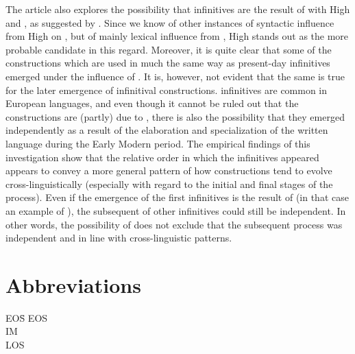 \documentclass[output=paper]{langscibook}
\begin{document}
The article also explores the possibility that  infinitives are the result of  with High  and , as suggested by \citet{Holm1967}. Since we know of other instances of syntactic influence from High  on , but of mainly lexical influence from , High  stands out as the more probable candidate in this regard. Moreover, it is quite clear that some of the   constructions which are used in much the same way as present-day   infinitives emerged under the influence of . It is, however, not evident that the same is true for the later emergence of infinitival constructions.  infinitives are common in European languages, and even though it cannot be ruled out that the  constructions are (partly) due to , there is also the possibility that they emerged independently as a result of the elaboration and specialization of the written language during the Early Modern period. The empirical findings of this investigation show that the relative order in which the  infinitives appeared appears to convey a more general pattern of how  constructions tend to evolve cross-linguistically (especially with regard to the initial and final stages of the process). Even if the emergence of the first  infinitives is the result of  (in that case an example of ), the subsequent  of other  infinitives could still be independent. In other words, the possibility of  does not exclude that the subsequent  process was independent and in line with cross-linguistic patterns. 


\section*{Abbreviations}
\begin{tabbing}
EOS\hspace{1ex}\= \kill
EOS \> \\
IM  \> \\
LOS \> \\
\end{tabbing}
\end{document}
